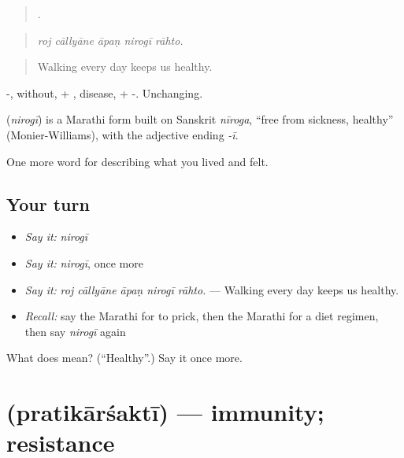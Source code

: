 \begin{quote}
    .
\end{quote}

\begin{quote}
\emph{roj cāllyāne āpaṇ nirogī rāhto.}
\end{quote}

\begin{quote}
Walking every day keeps us healthy.
\end{quote}

-, without, + , disease, + -. Unchanging.

\begin{cousinweb}
\textbf{} (\emph{nirogī}) is a Marathi form built on Sanskrit \emph{nīroga}, \textquotedblleft{}free from sickness, healthy\textquotedblright{} (Monier-Williams), with the adjective ending \emph{-ī}.
\end{cousinweb}

\begin{grammarlens}[title={What you've built}]
One more word for describing what you lived and felt.
\end{grammarlens}

\subsection*{Your turn}
\begin{itemize}
\raggedright
  \item \emph{Say it:} \emph{nirogī}
  \item \emph{Say it:} \emph{nirogī}, once more
  \item \emph{Say it:} \emph{roj cāllyāne āpaṇ nirogī rāhto.} — Walking every day keeps us healthy.
  \item \emph{Recall:} say the Marathi for to prick, then the Marathi for a diet regimen, then say \emph{nirogī} again
\end{itemize}

\begin{tcolorbox}[breakable,colback=teal!4,colframe=teal!35!black,title={Before you move on}]
What does  mean? (\textquotedblleft{}Healthy\textquotedblright{}.) Say it once more.
\end{tcolorbox}
\section[\texorpdfstring{\mr{प्रतिकारशक्ती} (pratikārśaktī)}{प्रतिकारशक्ती (pratikārśaktī)}]{ (pratikārśaktī) — immunity; resistance}

